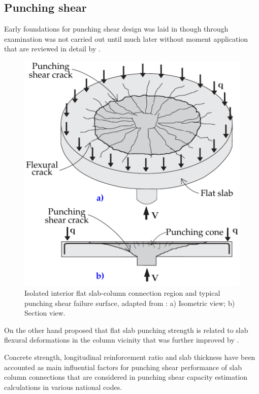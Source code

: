 \subsection{Punching shear}
Early foundations for punching shear design was laid in \cite{talbot1913reinforced} though through examination was not carried out until much later \citep{elstner1956shearing,moe1961} without moment application that are reviewed in detail by \cite{ghoreishi2013review,yang2011data,hamada2008evaluation}. 
\begin{figure}\centering
    \includegraphics[width=\columnwidth]{Figures/tikzout/b16if1.pdf}\caption{Isolated interior flat slab-column connection region and typical punching shear failure surface, adapted from \cite{bompa2016b}: a) Isometric view; b) Section view.}\label{b16if1}
    \end{figure}
On the other hand \cite{kinnunen1960} proposed that flat slab punching strength is related to slab flexural deformations in the column vicinity that was further improved by \cite{shehata1989punching,broms1990}.

Concrete strength, longitudinal reinforcement ratio and slab thickness have been accounted as main influential factors for punching shear performance of slab column connections\citep{yitzhaki1966,regan1981,tian2008behavior,marzouk1991} that are considered in punching shear capacity estimation calculations in various national codes\citep{gb500102010,aci31819,bs81101997,en1992}.


